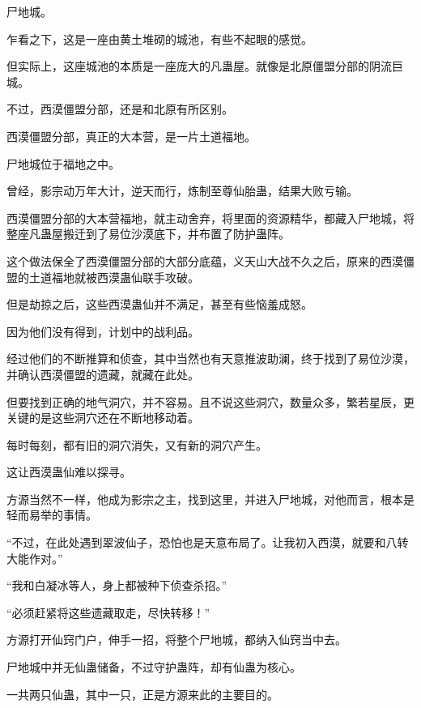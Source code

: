 \begin{this_body}
尸地城。

乍看之下，这是一座由黄土堆砌的城池，有些不起眼的感觉。

但实际上，这座城池的本质是一座庞大的凡蛊屋。就像是北原僵盟分部的阴流巨城。

不过，西漠僵盟分部，还是和北原有所区别。

西漠僵盟分部，真正的大本营，是一片土道福地。

尸地城位于福地之中。

曾经，影宗动万年大计，逆天而行，炼制至尊仙胎蛊，结果大败亏输。

西漠僵盟分部的大本营福地，就主动舍弃，将里面的资源精华，都藏入尸地城，将整座凡蛊屋搬迁到了易位沙漠底下，并布置了防护蛊阵。

这个做法保全了西漠僵盟分部的大部分底蕴，义天山大战不久之后，原来的西漠僵盟的土道福地就被西漠蛊仙联手攻破。

但是劫掠之后，这些西漠蛊仙并不满足，甚至有些恼羞成怒。

因为他们没有得到，计划中的战利品。

经过他们的不断推算和侦查，其中当然也有天意推波助澜，终于找到了易位沙漠，并确认西漠僵盟的遗藏，就藏在此处。

但要找到正确的地气洞穴，并不容易。且不说这些洞穴，数量众多，繁若星辰，更关键的是这些洞穴还在不断地移动着。

每时每刻，都有旧的洞穴消失，又有新的洞穴产生。

这让西漠蛊仙难以探寻。

方源当然不一样，他成为影宗之主，找到这里，并进入尸地城，对他而言，根本是轻而易举的事情。

“不过，在此处遇到翠波仙子，恐怕也是天意布局了。让我初入西漠，就要和八转大能作对。”

“我和白凝冰等人，身上都被种下侦查杀招。”

“必须赶紧将这些遗藏取走，尽快转移！”

方源打开仙窍门户，伸手一招，将整个尸地城，都纳入仙窍当中去。

尸地城中并无仙蛊储备，不过守护蛊阵，却有仙蛊为核心。

一共两只仙蛊，其中一只，正是方源来此的主要目的。

\end{this_body}

